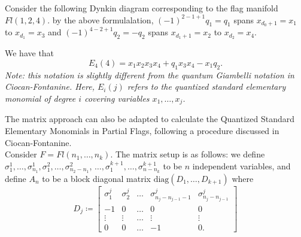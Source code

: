 \documentclass[11pt]{article}
\begin{document}
\begin{eg}
Consider the following Dynkin diagram corresponding to the flag manifold $Fl(1, 2, 4)$. by the above formulalation, $(-1)^{2-1+1}q_1 = q_1$ spans $x_{d_0 + 1} = x_1$ to $x_{d_1} = x_3$ and $(-1)^{4-2+1}q_2 = -q_2$ spans $x_{d_1 + 1} = x_2$ to $x_{d_2} = x_4$. 
\begin{center}
\end{center}

We have that
\[
    E_4(4) = x_1x_2x_3x_4 + q_1x_3x_4 - x_1q_2.
\]
\textit{Note: this notation is slightly different from the quantum Giambelli notation in Ciocan-Fontanine. Here, $E_i(j)$ refers to the quantized standard elementary monomial of degree $i$ covering variables $x_1, \dots, x_j$.}
\end{eg}

\vspace{0.25cm}

The matrix approach can also be adapted to calculate the Quantized Standard Elementary Monomials in Partial Flags, following a procedure discussed in Ciocan-Fontanine. \\

Consider $F = Fl(n_1, \dots, n_k)$. The matrix setup is as follows: we define $\sigma_1^1, \dots, \sigma_{n_1}^1, \sigma_1^2, \dots, \sigma_{n_2 - n_1}^2$, $\dots, \sigma_1^{k+1}, \dots, \sigma_{n-n_k}^{k+1}$ to be $n$ independent variables, and define $A_n$ to be a block diagonal matrix $\mathrm{diag}(D_1, \dots, D_{k+1})$ where
\[
    D_j \coloneqq \begin{bmatrix}
        \sigma_1^j & \sigma_2^j & \dots & \sigma_{n_j - n_{j-1} - 1}^j & \sigma_{n_j - n_{j-1}}^j \\
        -1 & 0 & \dots & 0 & 0 \\
        \vdots & \vdots & \dots & \vdots & \vdots \\
        0 & 0 & \dots & -1 & 0.
    \end{bmatrix}
\]
\end{document}
